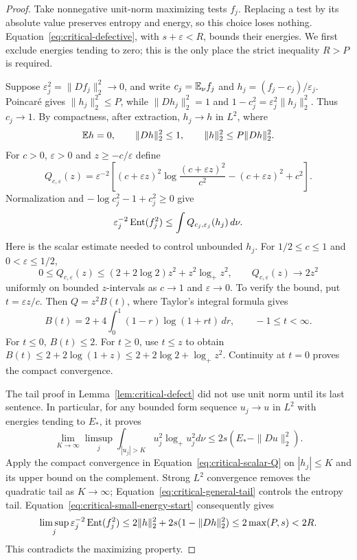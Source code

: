 \begin{proof}
Take nonnegative unit-norm maximizing tests $f_j$. Replacing a test
by its absolute value preserves entropy and energy, so this choice
loses nothing. Equation~\eqref{eq:critical-defective}, with
$s+\varepsilon<R$, bounds their energies. We first exclude
energies tending to zero; this is the only place the strict
inequality $R>P$ is required.

Suppose $\varepsilon_j^2=\|Df_j\|_2^2\to0$, and write
$c_j=\mathbb E_\nu f_j$ and $h_j=(f_j-c_j)/\varepsilon_j$.
Poincar\'e gives $\|h_j\|_2^2\le P$, while
$\|Dh_j\|_2^2=1$ and
$1-c_j^2=\varepsilon_j^2\|h_j\|_2^2$.
Thus $c_j\to1$. By compactness, after extraction,
$h_j\to h$ in $L^2$, where
\[
 \mathbb E h=0,\qquad \|Dh\|_2^2\le1,\qquad
 \|h\|_2^2\le P\|Dh\|_2^2.
\]
For $c>0$, $\varepsilon>0$ and $z\ge-c/\varepsilon$ define
\[
 Q_{c,\varepsilon}(z)=\varepsilon^{-2}
 \left[(c+\varepsilon z)^2\log\frac{(c+\varepsilon z)^2}{c^2}
                  -(c+\varepsilon z)^2+c^2\right].
\]
Normalization and $-\log c_j^2-1+c_j^2\ge0$ give
\begin{equation}\label{eq:critical-small-energy-start}
 \varepsilon_j^{-2}\operatorname{Ent}(f_j^2)
 \le\int Q_{c_j,\varepsilon_j}(h_j)\,d\nu.
\end{equation}
Here is the scalar estimate needed to control unbounded $h_j$.
For $1/2\le c\le1$ and $0<\varepsilon\le1/2$,
\begin{equation}\label{eq:critical-scalar-Q}
 0\le Q_{c,\varepsilon}(z)
 \le(2+2\log2)z^2+z^2\log_+z^2,
 \qquad Q_{c,\varepsilon}(z)\longrightarrow2z^2
\end{equation}
uniformly on bounded $z$-intervals as $c\to1$ and
$\varepsilon\to0$. To verify the bound, put $t=\varepsilon z/c$.
Then $Q=z^2B(t)$, where Taylor's integral formula gives
\[
 B(t)=2+4\int_0^1(1-r)\log(1+rt)\,dr,
 \qquad -1\le t<\infty.
\]
For $t\le0$, $B(t)\le2$. For $t\ge0$, use
$t\le z$ to obtain
$B(t)\le2+2\log(1+z)\le2+2\log2+\log_+z^2$.
Continuity at $t=0$ proves the compact convergence.

The tail proof in Lemma~\ref{lem:critical-defect} did not use
unit norm until its last sentence. In particular, for any bounded
form sequence $u_j\to u$ in $L^2$ with energies tending to $E_*$,
it proves
\begin{equation}\label{eq:critical-general-tail}
 \lim_{K\to\infty}\limsup_j
 \int_{|u_j|>K}u_j^2\log_+u_j^2d\nu
 \le2s(E_*-\|Du\|_2^2).
\end{equation}
Apply the compact convergence in Equation~\eqref{eq:critical-scalar-Q}
on $|h_j|\le K$ and its upper bound on the complement. Strong
$L^2$ convergence removes the quadratic tail as $K\to\infty$;
Equation~\eqref{eq:critical-general-tail} controls the entropy tail.
Equation~\eqref{eq:critical-small-energy-start} consequently gives
\[
 \limsup_j\varepsilon_j^{-2}\operatorname{Ent}(f_j^2)
 \le2\|h\|_2^2+2s(1-\|Dh\|_2^2)
 \le2\max(P,s)<2R.
\]
This contradicts the maximizing property.


\end{proof}

